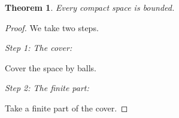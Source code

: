 \documentclass{article}
\makeatletter
\newtheorem{theorem}{Theorem}
\newcommand{\proofpart}[2]{%
  \par
  \addvspace{\medskipamount}%
  \noindent\emph{Step #1: #2}\par\nobreak
  \addvspace{\smallskipamount}%
  \@afterheading
}
\makeatother
\begin{document}
\begin{theorem}
Every compact space is bounded.
\end{theorem}
\begin{proof}
We take two steps.

\proofpart{1}{The cover:}
Cover the space by balls.

\proofpart{2}{The finite part:}
Take a finite part of the cover.
\end{proof}
\end{document}
